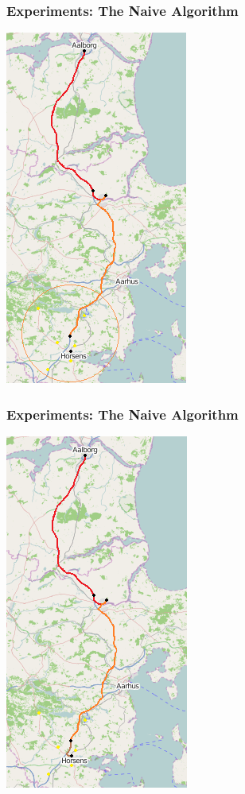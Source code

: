 \begin{frame}
  \frametitle{Experiments: The Naive Algorithm}
  \begin{center}
	  \includegraphics[scale=0.6]{images/AalborgtoHorsens2}  
  \end{center}
\end{frame}

\begin{frame}
  \frametitle{Experiments: The Naive Algorithm}
  \begin{center}
	  \includegraphics[scale=0.6]{images/AalborgtoHorsens3}  
  \end{center}
\end{frame}

